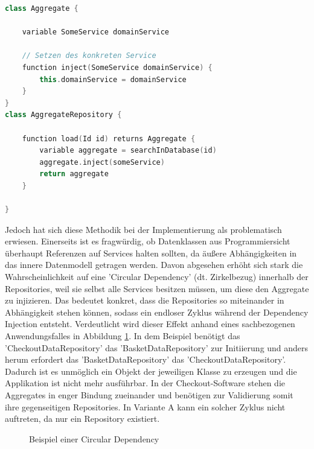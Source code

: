 \begin{minipage}{\linewidth} %
	\begin{lstlisting}[caption={Injektion des Services in ein Aggregate durch das Repository}, label={lst:injection}, language=Kotlin]
class Aggregate {
	
	variable SomeService domainService
	
	// Setzen des konkreten Service
	function inject(SomeService domainService) {
		this.domainService = domainService
	}
}
class AggregateRepository {
	
	function load(Id id) returns Aggregate {
		variable aggregate = searchInDatabase(id)
		aggregate.inject(someService)
		return aggregate
	}
	
}
	\end{lstlisting}
\end{minipage}

Jedoch hat sich diese Methodik bei der Implementierung als problematisch erwiesen. Einerseits ist es fragwürdig, ob Datenklassen aus Programmiersicht überhaupt Referenzen auf Services halten sollten, da äußere Abhängigkeiten in das innere Datenmodell getragen werden. Davon abgesehen erhöht sich stark die Wahrscheinlichkeit auf eine 'Circular Dependency' (dt. Zirkelbezug) innerhalb der Repositories, weil sie selbst alle Services besitzen müssen, um diese den Aggregate zu injizieren. Das bedeutet konkret, dass die Repositories so miteinander in Abhängigkeit stehen können, sodass ein endloser Zyklus während der Dependency Injection entsteht. Verdeutlicht wird dieser Effekt anhand eines sachbezogenen Anwendungsfalles in Abbildung \ref{fig:CircularDependency}. In dem Beispiel benötigt das 'CheckoutDataRepository' das 'BasketDataRepository' zur Initiierung und anders herum erfordert das 'BasketDataRepository' das 'CheckoutDataRepository'. Dadurch ist es unmöglich ein Objekt der jeweiligen Klasse zu erzeugen und die Applikation ist nicht mehr ausführbar. In der Checkout-Software stehen die Aggregates in enger Bindung zueinander und benötigen zur Validierung somit ihre gegenseitigen Repositories. In Variante A kann ein solcher Zyklus nicht auftreten, da nur ein Repository existiert.

\begin{figure}[htbp]
	\centering
	
	\caption{Beispiel einer Circular Dependency}
	\label{fig:CircularDependency}
\end{figure}

